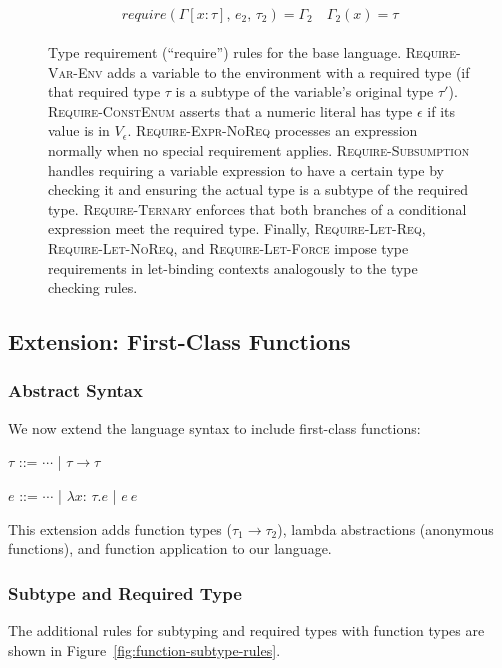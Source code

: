\documentclass[peerreview, 10pt]{IEEEtran}
\newcommand{\funct}[3]{\ensuremath{\lambda #1\mathsf{:}\,#2.#3}}
\newcommand{\apply}[2]{\ensuremath{#1\ #2}}
\newcommand{\arrowt}[2]{\ensuremath{{#1}\rightarrow{#2}}}
\newcommand{\requiretype}[4]{\ensuremath{{require}(#1,\,#2,\,#3)=#4}}
\begin{document}
\begin{figure*}[ht]
\begin{framed}
\begin{align*}
{\begin{array}{c}
\requiretype{\Gamma[x:\tau]}{e_2}{\tau_2}{\Gamma_2} \quad \Gamma_2(x) = \tau
\end{array}
}
\end{align*}
\end{framed}
\caption{Type requirement (``require'') rules for the base language. \textsc{Require-Var-Env} adds a variable to the environment with a required type (if that required type $\tau$ is a subtype of the variable's original type $\tau'$). \textsc{Require-ConstEnum} asserts that a numeric literal has type $\epsilon$ if its value is in $V_\epsilon$. \textsc{Require-Expr-NoReq} processes an expression normally when no special requirement applies. \textsc{Require-Subsumption} handles requiring a variable expression to have a certain type by checking it and ensuring the actual type is a subtype of the required type. \textsc{Require-Ternary} enforces that both branches of a conditional expression meet the required type. Finally, \textsc{Require-Let-Req}, \textsc{Require-Let-NoReq}, and \textsc{Require-Let-Force} impose type requirements in let-binding contexts analogously to the type checking rules.}
\label{fig:type-requiring-rules}
\end{figure*}

\subsection{Extension: First-Class Functions}
\subsubsection{Abstract Syntax}
We now extend the language syntax to include first-class functions:

\vspace{0.5em}
\begin{bnf}
    $\tau$ ::= $\cdots$ | \arrowt{\tau}{\tau}
\end{bnf}

\begin{bnf}
    $e$ ::= $\cdots$ 
    | \funct{x}{\tau}{e} 
    | \apply{e}{e}
\end{bnf}
\vspace{0.5em}

This extension adds function types ($\tau_1 \to \tau_2$), lambda abstractions (anonymous functions), and function application to our language.

\subsubsection{Subtype and Required Type}
The additional rules for subtyping and required types with function types are shown in Figure~\ref{fig:function-subtype-rules}.
\end{document}
